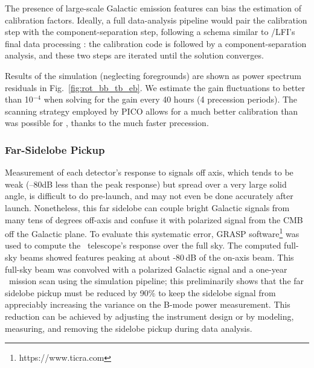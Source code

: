 \documentclass[PICOReport.tex]{subfiles}
\begin{document}
The presence of large-scale Galactic emission features can bias the estimation of calibration factors. Ideally, a full data-analysis pipeline would pair the calibration step with the component-separation step, following a schema similar to \planck/LFI's final data processing \cite{Planck2018_II}: the calibration code is followed by a component-separation analysis, and these two steps are iterated until the solution converges.

Results of the simulation (neglecting foregrounds) are shown as power spectrum residuals in Fig.~\ref{fig:rot_bb_tb_eb}. 
We estimate the gain fluctuations to better than 10$^{-4}$ when solving for the gain every 40 hours (4 precession periods).
The scanning strategy employed by PICO allows for a much better calibration than was possible for \planck, thanks to the much faster precession.

\subsubsection{Far-Sidelobe Pickup}
\label{sec:fsl}
Measurement of each detector's response to signals off axis, which tends to be weak (--80dB less than the peak response) but spread over a very large solid angle, is difficult to do pre-launch, and may not even be done accurately after launch.  Nonetheless, this far sidelobe can couple bright Galactic signals from many tens of degrees off-axis and confuse it with polarized signal from the CMB off the Galactic plane.    To evaluate this systematic error, GRASP software\footnote{https://www.ticra.com} was used to compute the \pico\ telescope's response over the full sky.  The computed full-sky beams showed features peaking at about -80\,dB of the on-axis beam.   
This full-sky beam was convolved with a polarized Galactic signal and a one-year \pico\ mission scan using the simulation pipeline; this preliminarily shows that the far sidelobe pickup must be reduced by 90\%  to keep the sidelobe signal from appreciably increasing the variance on the B-mode power measurement.
This reduction can be achieved by adjusting the instrument design or by modeling, measuring, and removing the sidelobe pickup during data analysis.
\end{document}
